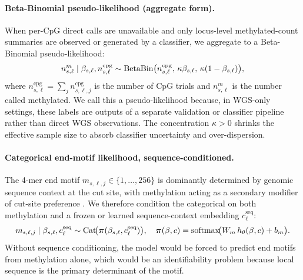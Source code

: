 \paragraph{Beta-Binomial pseudo-likelihood (aggregate form).} When per-CpG direct calls are unavailable and only locus-level methylated-count summaries are observed or generated by a classifier, we aggregate to a Beta-Binomial pseudo-likelihood:
\begin{equation}
n^m_{s,\ell}\mid \beta_{s,\ell}, n^{\mathrm{cpg}}_{s,\ell} \sim \mathrm{BetaBin}\big(n^{\mathrm{cpg}}_{s,\ell},\, \kappa\beta_{s,\ell},\,\kappa(1-\beta_{s,\ell})\big),
\label{eq:bb}
\end{equation}
where $n^{\mathrm{cpg}}_{s,\ell}=\sum_j n^{\mathrm{cpg}}_{s,\ell,j}$ is the number of CpG trials and $n^m_{s,\ell}$ is the number called methylated. We call this a pseudo-likelihood because, in WGS-only settings, these labels are outputs of a separate validation or classifier pipeline rather than direct WGS observations. The concentration $\kappa>0$ shrinks the effective sample size to absorb classifier uncertainty and over-dispersion.

\paragraph{Categorical end-motif likelihood, sequence-conditioned.} The 4-mer end motif $m_{s,\ell,j}\in\{1,\dots,256\}$ is dominantly determined by genomic sequence context at the cut site, with methylation acting as a secondary modifier of cut-site preference \citep{zhou2022}. We therefore condition the categorical on both methylation and a frozen or learned sequence-context embedding $c^{\mathrm{seq}}_\ell$:
\begin{equation}
m_{s,\ell,j}\mid \beta_{s,\ell}, c^{\mathrm{seq}}_\ell \sim \mathrm{Cat}\!\big(\boldsymbol{\pi}(\beta_{s,\ell}, c^{\mathrm{seq}}_\ell)\big),\quad
\boldsymbol{\pi}(\beta, c) = \mathrm{softmax}\!\big(W_m\,h_\theta(\beta, c) + b_m\big).
\end{equation}
Without sequence conditioning, the model would be forced to predict end motifs from methylation alone, which would be an identifiability problem because local sequence is the primary determinant of the motif.

